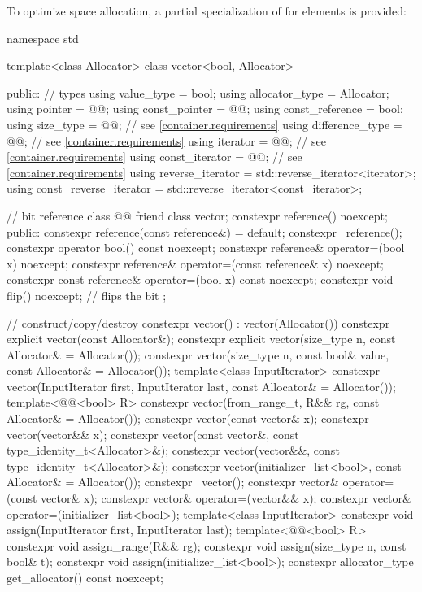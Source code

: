 \pnum
{}%
To optimize space allocation, a partial specialization of  for
 elements is provided:
\begin{codeblock}
namespace std {
  template<class Allocator>
  class vector<bool, Allocator> {
  public:
    // types
    using value_type             = bool;
    using allocator_type         = Allocator;
    using pointer                = @@;
    using const_pointer          = @@;
    using const_reference        = bool;
    using size_type              = @@; // see \ref{container.requirements}
    using difference_type        = @@; // see \ref{container.requirements}
    using iterator               = @@; // see \ref{container.requirements}
    using const_iterator         = @@; // see \ref{container.requirements}
    using reverse_iterator       = std::reverse_iterator<iterator>;
    using const_reverse_iterator = std::reverse_iterator<const_iterator>;

    // bit reference
    class @@ {
      friend class vector;
      constexpr reference() noexcept;
    public:
      constexpr reference(const reference&) = default;
      constexpr ~reference();
      constexpr operator bool() const noexcept;
      constexpr reference& operator=(bool x) noexcept;
      constexpr reference& operator=(const reference& x) noexcept;
      constexpr const reference& operator=(bool x) const noexcept;
      constexpr void flip() noexcept;   // flips the bit
    };

    // construct/copy/destroy
    constexpr vector() : vector(Allocator()) { }
    constexpr explicit vector(const Allocator&);
    constexpr explicit vector(size_type n, const Allocator& = Allocator());
    constexpr vector(size_type n, const bool& value, const Allocator& = Allocator());
    template<class InputIterator>
      constexpr vector(InputIterator first, InputIterator last, const Allocator& = Allocator());
    template<@@<bool> R>
      constexpr vector(from_range_t, R&& rg, const Allocator& = Allocator());
    constexpr vector(const vector& x);
    constexpr vector(vector&& x);
    constexpr vector(const vector&, const type_identity_t<Allocator>&);
    constexpr vector(vector&&, const type_identity_t<Allocator>&);
    constexpr vector(initializer_list<bool>, const Allocator& = Allocator());
    constexpr ~vector();
    constexpr vector& operator=(const vector& x);
    constexpr vector& operator=(vector&& x);
    constexpr vector& operator=(initializer_list<bool>);
    template<class InputIterator>
      constexpr void assign(InputIterator first, InputIterator last);
    template<@@<bool> R>
      constexpr void assign_range(R&& rg);
    constexpr void assign(size_type n, const bool& t);
    constexpr void assign(initializer_list<bool>);
    constexpr allocator_type get_allocator() const noexcept;

}}
\end{codeblock}
